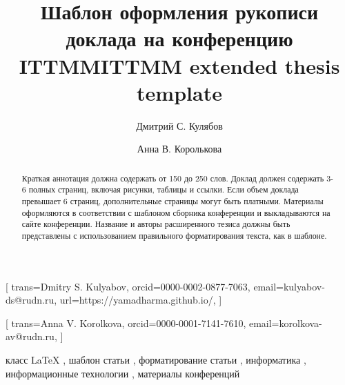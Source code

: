 \documentclass[%
]{ittmm}
\begin{document}



\title{Шаблон оформления рукописи доклада на конференцию ITTMM}
\title[mode=trans]{ITTMM extended thesis template}


\author[1,2]{Дмитрий С. Кулябов}[%
trans={Dmitry S. Kulyabov},
orcid=0000-0002-0877-7063,
email=kulyabov-ds@rudn.ru,
url=https://yamadharma.github.io/,
]
\cormark[1]

\author[1]{Анна В. Королькова}[%
trans={Anna V. Korolkova},
orcid=0000-0001-7141-7610,
email=korolkova-av@rudn.ru,
]
\address[1]{Российский университет дружбы народов, ул. Миклухо-Маклая, д. 6, Москва, 117198, Российская Федерация}
\address[2]{Объединённый институт ядерных исследований, ул. Жолио-Кюри 6, Дубна, 141980, Российская Федерация}


\begin{abstract}
  Краткая аннотация должна содержать от 150 до 250 слов.
  Доклад должен содержать 3-6 полных страниц, включая рисунки, таблицы и ссылки.
  Если объем доклада превышает 6 страниц, дополнительные страницы могут быть платными.
  Материалы оформляются в соответствии с шаблоном сборника конференции и выкладываются на сайте конференции.
  Название и авторы расширенного тезиса должны быть представлены с использованием правильного форматирования текста, как в шаблоне.
\end{abstract}

\begin{keywords}
  класс LaTeX \sep
  шаблон статьи \sep
  форматирование статьи \sep
  информатика \sep
  информационные технологии \sep
  материалы конференций
\end{keywords}
\end{document}
